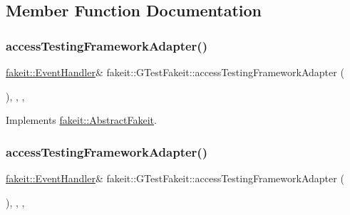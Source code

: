 \subsection{Member Function Documentation}
\mbox{\label{classfakeit_1_1GTestFakeit_aab1288d4764301be458751d47164ee55}} 
\subsubsection{\texorpdfstring{accessTestingFrameworkAdapter()}{accessTestingFrameworkAdapter()}\hspace{0.1cm}{\footnotesize\ttfamily [1/2]}}
{\footnotesize\ttfamily \mbox{\hyperlink{structfakeit_1_1EventHandler}{fakeit\+::\+Event\+Handler}}\& fakeit\+::\+G\+Test\+Fakeit\+::access\+Testing\+Framework\+Adapter (\begin{DoxyParamCaption}{ }\end{DoxyParamCaption})\hspace{0.3cm}{\ttfamily [inline]}, {\ttfamily [override]}, {\ttfamily [protected]}, {\ttfamily [virtual]}}



Implements \mbox{\hyperlink{classfakeit_1_1AbstractFakeit_a9476180a503524d49d1978fbbc125b01}{fakeit\+::\+Abstract\+Fakeit}}.

\mbox{\label{classfakeit_1_1GTestFakeit_aab1288d4764301be458751d47164ee55}} 
\subsubsection{\texorpdfstring{accessTestingFrameworkAdapter()}{accessTestingFrameworkAdapter()}\hspace{0.1cm}{\footnotesize\ttfamily [2/2]}}
{\footnotesize\ttfamily \mbox{\hyperlink{structfakeit_1_1EventHandler}{fakeit\+::\+Event\+Handler}}\& fakeit\+::\+G\+Test\+Fakeit\+::access\+Testing\+Framework\+Adapter (\begin{DoxyParamCaption}{ }\end{DoxyParamCaption})\hspace{0.3cm}{\ttfamily [inline]}, {\ttfamily [override]}, {\ttfamily [protected]}, {\ttfamily [virtual]}}



